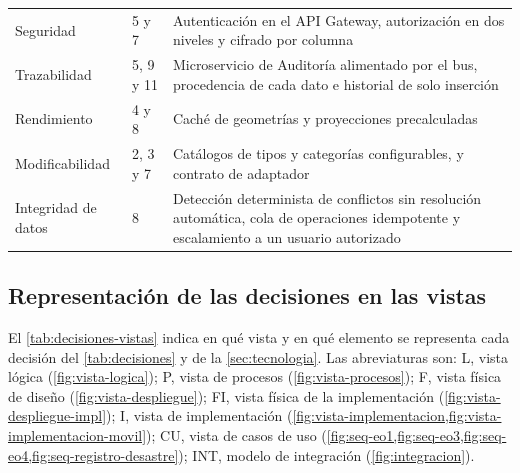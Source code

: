 \documentclass[11pt,letterpaper]{article}
\begin{document}
\begin{longtable}{L{5.2cm} L{1.9cm} L{8.7cm}}
Seguridad & 5 y 7 & Autenticación en el API Gateway, autorización en dos niveles y cifrado por
columna \\
Trazabilidad & 5, 9 y 11 & Microservicio de Auditoría alimentado por el bus, procedencia de cada
dato e historial de solo inserción \\
Rendimiento & 4 y 8 & Caché de geometrías y proyecciones precalculadas \\
Modificabilidad & 2, 3 y 7 & Catálogos de tipos y categorías configurables, y contrato de
adaptador \\
Integridad de datos & 8 & Detección determinista de conflictos sin resolución automática, cola de
operaciones idempotente y escalamiento a un usuario autorizado \\
\end{longtable}

\subsection{Representación de las decisiones en las vistas}
\label{sec:decisiones-vistas}

El \cref{tab:decisiones-vistas} indica en qué vista y en qué elemento se representa cada decisión
del \cref{tab:decisiones} y de la \cref{sec:tecnologia}. Las abreviaturas son: L, vista lógica
(\cref{fig:vista-logica}); P, vista de procesos (\cref{fig:vista-procesos}); F, vista física de
diseño (\cref{fig:vista-despliegue}); FI, vista física de la implementación
(\cref{fig:vista-despliegue-impl}); I, vista de implementación
(\cref{fig:vista-implementacion,fig:vista-implementacion-movil}); CU, vista de casos de uso
(\cref{fig:seq-eo1,fig:seq-eo3,fig:seq-eo4,fig:seq-registro-desastre}); INT, modelo de integración
(\cref{fig:integracion}).
\end{document}
